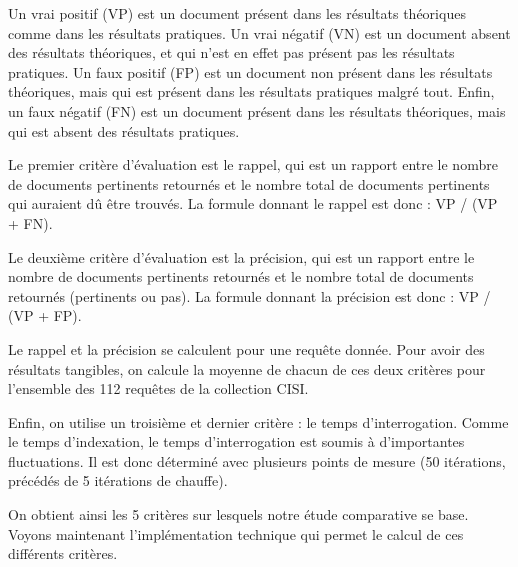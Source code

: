 Un vrai positif (VP) est un document présent dans les résultats théoriques comme dans les résultats pratiques. Un vrai négatif (VN) est un document absent des résultats théoriques, et qui n'est en effet pas présent pas les résultats pratiques. Un faux positif (FP) est un document non présent dans les résultats théoriques, mais qui est présent dans les résultats pratiques malgré tout. Enfin, un faux négatif (FN) est un document présent dans les résultats théoriques, mais qui est absent des résultats pratiques.

Le premier critère d'évaluation est le rappel, qui est un rapport entre le nombre de documents pertinents retournés et le nombre total de documents pertinents qui auraient dû être trouvés. La formule donnant le rappel est donc : VP / (VP + FN). 

Le deuxième critère d'évaluation est la précision, qui est un rapport entre le nombre de documents pertinents retournés et le nombre total de documents retournés (pertinents ou pas). La formule donnant la précision est donc : VP / (VP + FP).

Le rappel et la précision se calculent pour une requête donnée. Pour avoir des résultats tangibles, on calcule la moyenne de chacun de ces deux critères pour l’ensemble des 112 requêtes de la collection CISI.

Enfin, on utilise un troisième et dernier critère : le temps d’interrogation. Comme le temps d’indexation, le temps d’interrogation est soumis à d’importantes fluctuations. Il est donc déterminé avec plusieurs points de mesure (50 itérations, précédés de 5 itérations de chauffe).

On obtient ainsi les 5 critères sur lesquels notre étude comparative se base. Voyons maintenant l’implémentation technique qui permet le calcul de ces différents critères.